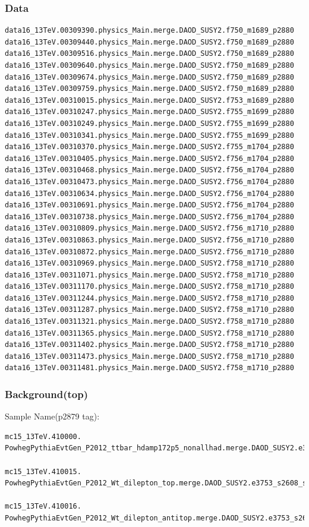 \documentclass[mathserif,serif]{beamer}
\begin{document}
\begin{frame}[fragile]
\frametitle{Data}
\tiny
\begin{verbatim}
data16_13TeV.00309390.physics_Main.merge.DAOD_SUSY2.f750_m1689_p2880
data16_13TeV.00309440.physics_Main.merge.DAOD_SUSY2.f750_m1689_p2880
data16_13TeV.00309516.physics_Main.merge.DAOD_SUSY2.f750_m1689_p2880
data16_13TeV.00309640.physics_Main.merge.DAOD_SUSY2.f750_m1689_p2880
data16_13TeV.00309674.physics_Main.merge.DAOD_SUSY2.f750_m1689_p2880
data16_13TeV.00309759.physics_Main.merge.DAOD_SUSY2.f750_m1689_p2880
data16_13TeV.00310015.physics_Main.merge.DAOD_SUSY2.f753_m1689_p2880
data16_13TeV.00310247.physics_Main.merge.DAOD_SUSY2.f755_m1699_p2880
data16_13TeV.00310249.physics_Main.merge.DAOD_SUSY2.f755_m1699_p2880
data16_13TeV.00310341.physics_Main.merge.DAOD_SUSY2.f755_m1699_p2880
data16_13TeV.00310370.physics_Main.merge.DAOD_SUSY2.f755_m1704_p2880
data16_13TeV.00310405.physics_Main.merge.DAOD_SUSY2.f756_m1704_p2880
data16_13TeV.00310468.physics_Main.merge.DAOD_SUSY2.f756_m1704_p2880
data16_13TeV.00310473.physics_Main.merge.DAOD_SUSY2.f756_m1704_p2880
data16_13TeV.00310634.physics_Main.merge.DAOD_SUSY2.f756_m1704_p2880
data16_13TeV.00310691.physics_Main.merge.DAOD_SUSY2.f756_m1704_p2880
data16_13TeV.00310738.physics_Main.merge.DAOD_SUSY2.f756_m1704_p2880
data16_13TeV.00310809.physics_Main.merge.DAOD_SUSY2.f756_m1710_p2880
data16_13TeV.00310863.physics_Main.merge.DAOD_SUSY2.f756_m1710_p2880
data16_13TeV.00310872.physics_Main.merge.DAOD_SUSY2.f756_m1710_p2880
data16_13TeV.00310969.physics_Main.merge.DAOD_SUSY2.f758_m1710_p2880
data16_13TeV.00311071.physics_Main.merge.DAOD_SUSY2.f758_m1710_p2880
data16_13TeV.00311170.physics_Main.merge.DAOD_SUSY2.f758_m1710_p2880
data16_13TeV.00311244.physics_Main.merge.DAOD_SUSY2.f758_m1710_p2880
data16_13TeV.00311287.physics_Main.merge.DAOD_SUSY2.f758_m1710_p2880
data16_13TeV.00311321.physics_Main.merge.DAOD_SUSY2.f758_m1710_p2880
data16_13TeV.00311365.physics_Main.merge.DAOD_SUSY2.f758_m1710_p2880
data16_13TeV.00311402.physics_Main.merge.DAOD_SUSY2.f758_m1710_p2880
data16_13TeV.00311473.physics_Main.merge.DAOD_SUSY2.f758_m1710_p2880
data16_13TeV.00311481.physics_Main.merge.DAOD_SUSY2.f758_m1710_p2880
\end{verbatim}
\end{frame}

\begin{frame}[fragile]
\frametitle{Background(top)}
\small
Sample Name(p2879 tag):
\tiny
\begin{verbatim}
mc15_13TeV.410000.
PowhegPythiaEvtGen_P2012_ttbar_hdamp172p5_nonallhad.merge.DAOD_SUSY2.e3698_s2608_s2183_r7725_r7676_p2879

mc15_13TeV.410015.
PowhegPythiaEvtGen_P2012_Wt_dilepton_top.merge.DAOD_SUSY2.e3753_s2608_s2183_r7725_r7676_p2879

mc15_13TeV.410016.
PowhegPythiaEvtGen_P2012_Wt_dilepton_antitop.merge.DAOD_SUSY2.e3753_s2608_s2183_r7725_r7676_p2879
\end{verbatim}
\end{frame}
\end{document}
